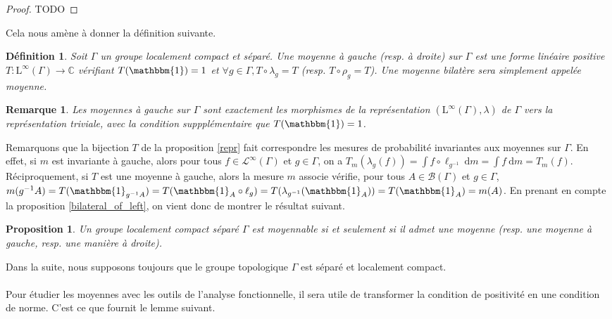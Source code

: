 \documentclass[a4paper,12pt]{article}
\newtheorem{proposition}[theorem]{Proposition}
\newtheorem{definition}[theorem]{Définition}
\newtheorem{remark}[theorem]{Remarque}
\newcommand{\C}{\mathbb{C}}
\newcommand{\Bor}{\mathcal{B}}
\newcommand{\indic}{\mathbbm{1}}
\newcommand{\integral}[2]{\int #1~\mathrm{d}#2}
\newcommand{\ssi}{si et seulement si }
\newcommand{\inv}{^{-1}}
\newcommand{\comp}{\circ}
\begin{document}
\begin{proof}
    TODO
\end{proof}

Cela nous amène à donner la définition suivante.

\begin{definition}
    Soit $\Gamma$ un groupe localement compact et séparé. Une \emph{moyenne à gauche (resp. à droite)} sur $\Gamma$ est une forme 
    linéaire positive $T : \mathrm{L}^\infty(\Gamma)\to\C$ vérifiant $T(\indic) = 1$ et $\forall g\in\Gamma, T\comp\lambda_g = T$
    (resp. $T\comp\rho_g = T$). Une moyenne bilatère sera simplement appelée \emph{moyenne}.
\end{definition}

\begin{remark}
    Les moyennes à gauche sur $\Gamma$ sont exactement les morphismes de la représentation $(\mathrm{L}^\infty(\Gamma), \lambda)$ de 
    $\Gamma$ vers la représentation triviale, avec la condition suppplémentaire que $T(\indic) = 1$.
\end{remark}

Remarquons que la bijection $T$ de la proposition \ref{repr} fait correspondre les mesures de probabilité 
invariantes aux moyennes sur $\Gamma$. En effet, si $m$ est invariante à gauche, alors pour tous 
$f\in\mathscr{L}^\infty(\Gamma)$ et $g\in\Gamma$, on a 
$T_m(\lambda_g(f)) = \integral{f\comp\ell_{g\inv}}{m} = \integral{f}{m} = T_m(f)$. Réciproquement, si $T$ est une 
moyenne à gauche, alors la mesure $m$ associe vérifie, pour tous $A\in\Bor(\Gamma)$ et $g\in\Gamma$, 
$m(g\inv A) = T(\indic_{g\inv A}) = T(\indic_A \comp\ell_g) = T(\lambda_{g\inv}(\indic_A)) = T(\indic_A) = m(A)$.
En prenant en compte la proposition \ref{bilateral_of_left}, on vient donc de montrer le résultat suivant.
\begin{proposition}
    Un groupe localement compact séparé $\Gamma$ est moyennable \ssi il admet une moyenne (resp. une moyenne à gauche, resp. une manière à droite).
\end{proposition}

Dans la suite, nous supposons toujours que le groupe topologique $\Gamma$ est séparé et localement compact.
\paragraph{}

Pour étudier les moyennes avec les outils de l'analyse fonctionnelle, il sera utile de transformer la condition de positivité en une condition
de norme. C'est ce que fournit le lemme suivant.
\end{document}
